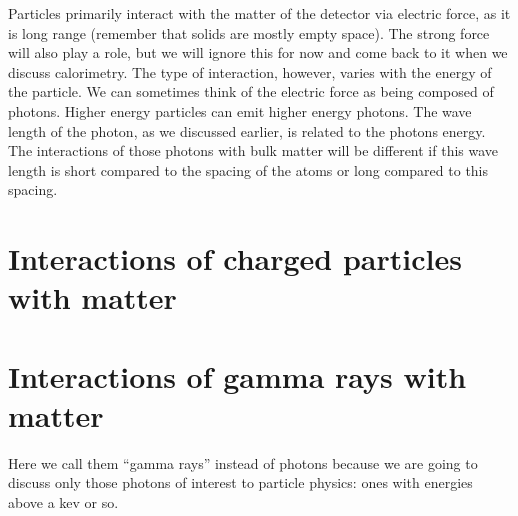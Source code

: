 Particles primarily interact with the matter of the detector via electric force, as it is long range (remember that solids are mostly empty space).  The strong force will also play a role, but we will ignore this for now and come back to it when we discuss calorimetry.  The type of interaction, however, varies with the energy of the particle.  We can sometimes think of the electric force as being composed of photons.  Higher energy particles can emit higher energy photons.  The wave length of the photon, as we discussed earlier, is related to the photons energy.  The interactions of those photons with bulk matter will be different if this wave length is short compared to the spacing of the atoms or long compared to this spacing.


\section{Interactions of charged particles with matter}

\section{Interactions of gamma rays with matter}

Here we call them “gamma rays” instead of photons because we are going to discuss only those photons of interest to particle physics: ones with energies above a kev or so.



